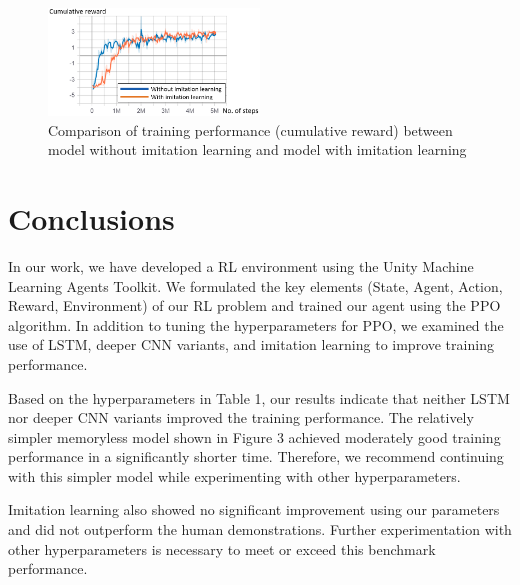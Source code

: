 \documentclass{article}
\begin{document}
\begin{figure}[h]
\centering
\includegraphics[width=0.5\textwidth]{images/fig3.png}
\caption{Comparison of training performance (cumulative reward) between model without imitation learning and model with imitation learning}\label{fig4}
\end{figure}


\section{Conclusions} \label{ref:conclusion}
In our work, we have developed a RL environment using the Unity Machine Learning Agents Toolkit. We formulated the key elements (State, Agent, Action, Reward, Environment) of our RL problem and trained our agent using the PPO algorithm. In addition to tuning the hyperparameters for PPO, we examined the use of LSTM, deeper CNN variants, and imitation learning to improve training performance.

Based on the hyperparameters in Table 1, our results indicate that neither LSTM nor deeper CNN variants improved the training performance. The relatively simpler memoryless model shown in Figure 3 achieved moderately good training performance in a significantly shorter time. Therefore, we recommend continuing with this simpler model while experimenting with other hyperparameters. 

Imitation learning also showed no significant improvement using our parameters and did not outperform the human demonstrations. Further experimentation with other hyperparameters is necessary to meet or exceed this benchmark performance.

\end{document}
